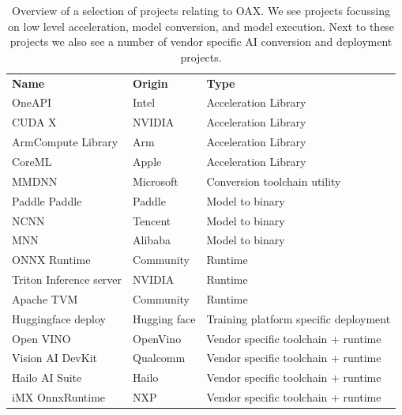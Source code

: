 \documentclass{article}
\begin{document}
\begin{table}[h!tp]
\begin{tabular}{lll}
\textbf{Name}          	 	& \textbf{Origin} & \textbf{Type}                         \\
OneAPI\cite{OneAPI}                  		& Intel           & Acceleration Library                  \\
CUDA X\cite{CUDAX}                 		 & NVIDIA          & Acceleration Library                  \\
ArmCompute Library\cite{ArmCompute}      	& Arm             & Acceleration Library                  \\
CoreML\cite{CoreML}                		 & Apple           & Acceleration Library                  \\
MMDNN\cite{MMdnn}         & Microsoft       & Conversion toolchain utility          \\
Paddle Paddle\cite{PaddlePaddle}           	& Paddle          & Model to binary                       \\
NCNN\cite{NCNN}                    		& Tencent         & Model to binary                       \\
MNN\cite{MNN}                     		& Alibaba         & Model to binary                       \\
ONNX Runtime\cite{ONNXRuntime}            	& Community       & Runtime                               \\
Triton Inference server\cite{Triton} 	& NVIDIA          & Runtime                               \\
Apache TVM\cite{TVM}              	& Community       & Runtime                               \\
Huggingface deploy\cite{Huggingface}      	& Hugging face    & Training platform specific deployment \\
Open VINO\cite{OpenVINO}              		& OpenVino        & Vendor specific toolchain + runtime   \\
Vision AI DevKit\cite{VisionAIDevKit}       		& Qualcomm        & Vendor specific toolchain + runtime   \\
Hailo  AI Suite\cite{Hailo}                 		& Hailo           & Vendor specific toolchain + runtime   \\
iMX OnnxRuntime\cite{iMX}       	& NXP             & Vendor specific toolchain + runtime  
\end{tabular}
\caption{Overview of a selection of projects relating to OAX. We see projects focussing on low level acceleration, model conversion, and model execution. Next to these projects we also see a number of vendor specific AI conversion and deployment projects.}
\label{tab:overview}
\end{table}
\end{document}

